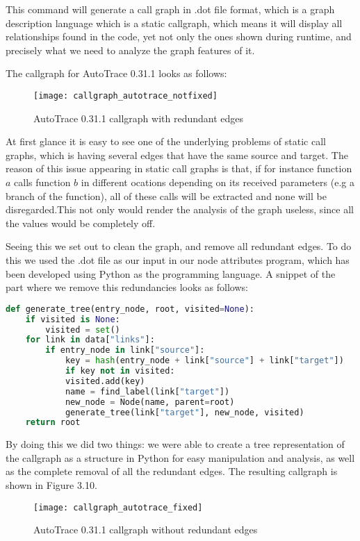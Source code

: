 This command will generate a call graph in .dot file format, which is a graph description language \parencite{dot} which is a static callgraph, which means it will display all relationships found in the code, yet not only the ones shown during runtime, and precisely what we need to analyze the graph features of it.

The callgraph for AutoTrace 0.31.1 looks as follows:

\begin{figure}[!htb]
	\caption{AutoTrace 0.31.1 callgraph with redundant edges}
	\centering
	\texttt{[image: callgraph\_autotrace\_notfixed]}
\end{figure}

At first glance it is easy to see one of the underlying problems of static call graphs, which is having several edges that have the same source and target. The reason of this issue appearing in static call graphs is that, if for instance function $a$ calls function $b$ in different ocations depending on its received parameters (e.g a branch of the function), all of these calls will be extracted and none will be disregarded.This not only would render the analysis of the graph useless, since all the values would be completely off.

Seeing this we set out to clean the graph, and remove all redundant edges. To do this we used the .dot file as our input in our node attributes program, which has been developed using Python as the programming language. A snippet of the part where we remove this redundancies looks as follows:

\begin{lstlisting}[language=python]
def generate_tree(entry_node, root, visited=None):
	if visited is None:
		visited = set()
	for link in data["links"]:
		if entry_node in link["source"]:
			key = hash(entry_node + link["source"] + link["target"])
			if key not in visited:
			visited.add(key)
			name = find_label(link["target"])
			new_node = Node(name, parent=root)
			generate_tree(link["target"], new_node, visited)
	return root
\end{lstlisting}

By doing this we did two things: we were able to create a tree representation of the callgraph as a structure in Python for easy manipulation and analysis, as well as the complete removal of all the redundant edges. The resulting callgraph is shown in Figure 3.10.

\begin{figure}[!htb]
	\caption{AutoTrace 0.31.1 callgraph without redundant edges}
	\centering
	\texttt{[image: callgraph\_autotrace\_fixed]}
\end{figure}

